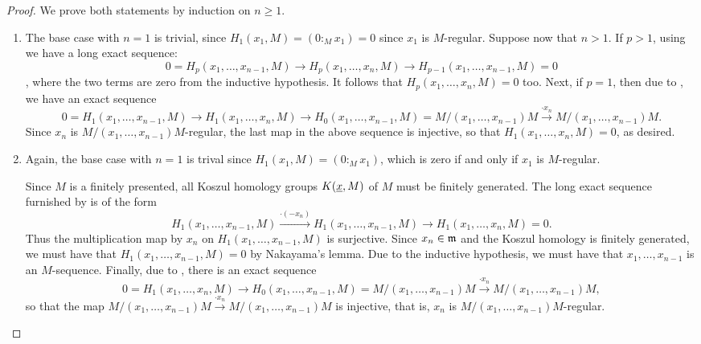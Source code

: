 \begin{proof}
We prove both statements by induction on $n\ge 1$.
\begin{enumerate}[label=(\arabic*)]
    \item The base case with $n = 1$ is trivial, since $H_1(x_1, M) = (0 :_M x_1) = 0$ since $x_1$ is $M$-regular. Suppose now that $n > 1$. If $p > 1$, using  we have a long exact sequence: 
    \begin{equation*}
        0 = H_p(x_1, \dots, x_{n - 1}, M)\to H_p(x_1,\dots,x_n, M)\to H_{p - 1}(x_1,\dots,x_{n - 1}, M) = 0
    \end{equation*},
    where the two terms are zero from the inductive hypothesis. It follows that $H_p(x_1,\dots,x_n, M) = 0$ too. Next, if $p = 1$, then due to , we have an exact sequence
    \begin{equation*}
        0 = H_1(x_1,\dots, x_{n - 1}, M)\to H_1(x_1,\dots,x_n, M)\to H_0(x_1,\dots,x_{n - 1}, M) = M/(x_1,\dots,x_{n - 1})M\xrightarrow{\cdot x_n} M/(x_1,\dots,x_{n - 1})M.
    \end{equation*}
    Since $x_n$ is $M/(x_1,\dots,x_{n - 1})M$-regular, the last map in the above sequence is injective, so that $H_1(x_1,\dots,x_n, M) = 0$, as desired. 

    \item Again, the base case with $n = 1$ is trival since $H_1(x_1, M) = (0 :_M x_1)$, which is zero if and only if $x_1$ is $M$-regular.
    
    Since $M$ is a finitely presented, all Koszul homology groups $K(\underline{x}, M)$ of $M$ must be finitely generated. The long exact sequence furnished by  is of the form 
    \begin{equation*}
        H_1(x_1,\dots,x_{n - 1}, M)\xrightarrow{\cdot(-x_n)}H_1(x_1,\dots,x_{n - 1}, M)\to H_1(x_1,\dots,x_n, M) = 0.
    \end{equation*}
    Thus the multiplication map by $x_n$ on $H_1(x_1,\dots,x_{n - 1}, M)$ is surjective. Since $x_n\in\mathfrak{m}$ and the Koszul homology is finitely generated, we must have that $H_1(x_1,\dots,x_{n - 1}, M) = 0$ by Nakayama's lemma. Due to the inductive hypothesis, we must have that $x_1,\dots, x_{n - 1}$ is an $M$-sequence. Finally, due to , there is an exact sequence 
    \begin{equation*}
        0 = H_1(x_1,\dots,x_n, M)\to H_0(x_1,\dots,x_{n - 1}, M) = M/(x_1,\dots,x_{n - 1})M\xrightarrow{\cdot x_n} M/(x_1,\dots,x_{n - 1})M,
    \end{equation*}
    so that the map $M/(x_1,\dots,x_{n - 1})M\xrightarrow{\cdot x_n} M/(x_1,\dots,x_{n - 1})M$ is injective, that is, $x_n$ is $M/(x_1,\dots,x_{n - 1})M$-regular. \qedhere
\end{enumerate}
\end{proof}

